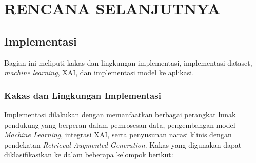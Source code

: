 \chapter{RENCANA SELANJUTNYA}
\label{chap:rencana-selanjutnya}


\section{Implementasi}
Bagian ini meliputi kakas dan lingkungan implementasi, implementasi dataset, \textit{machine learning}, XAI, dan implementasi model ke aplikasi.

\subsection{Kakas dan Lingkungan Implementasi}
Implementasi dilakukan dengan memanfaatkan berbagai perangkat lunak pendukung yang berperan dalam pemrosesan data, pengembangan model \textit{Machine Learning}, integrasi XAI, serta penyusunan narasi klinis dengan pendekatan \textit{Retrieval Augmented Generation}. Kakas yang digunakan dapat diklasifikasikan ke dalam beberapa kelompok berikut:

